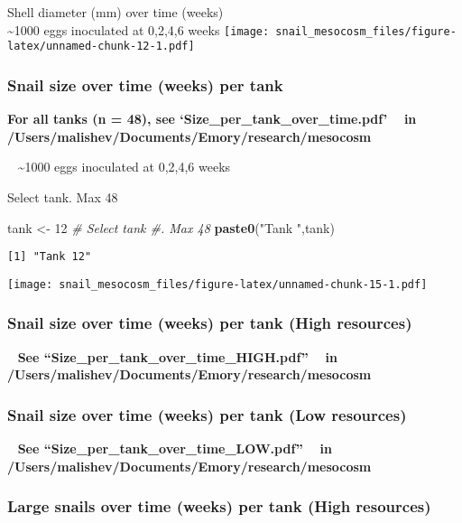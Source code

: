 \documentclass[10,portrait]{article}
\newenvironment{Shaded}{\begin{snugshade}}{\end{snugshade}}
\newcommand{\KeywordTok}[1]{\textcolor[rgb]{0.13,0.29,0.53}{\textbf{#1}}}
\newcommand{\DecValTok}[1]{\textcolor[rgb]{0.00,0.00,0.81}{#1}}
\newcommand{\StringTok}[1]{\textcolor[rgb]{0.31,0.60,0.02}{#1}}
\newcommand{\CommentTok}[1]{\textcolor[rgb]{0.56,0.35,0.01}{\textit{#1}}}
\newcommand{\NormalTok}[1]{#1}
\begin{document}
Shell diameter (mm) over time (weeks)\\
\textasciitilde{}1000 eggs inoculated at 0,2,4,6 weeks
\texttt{[image: snail\_mesocosm\_files/figure-latex/unnamed-chunk-12-1.pdf]}

\subsubsection{Snail size over time (weeks) per
tank}\label{snail-size-over-time-weeks-per-tank}

\textbf{For all tanks (n = 48), see `Size\_per\_tank\_over\_time.pdf' ~
in /Users/malishev/Documents/Emory/research/mesocosm}

~ \textasciitilde{}1000 eggs inoculated at 0,2,4,6 weeks

Select tank. Max 48

\begin{Shaded}
\begin{Highlighting}[]
\NormalTok{tank <-}\StringTok{ }\DecValTok{12} \CommentTok{# Select tank #. Max 48   }
\KeywordTok{paste0}\NormalTok{(}\StringTok{"Tank "}\NormalTok{,tank) }
\end{Highlighting}
\end{Shaded}

\begin{verbatim}
[1] "Tank 12"
\end{verbatim}

\texttt{[image: snail\_mesocosm\_files/figure-latex/unnamed-chunk-15-1.pdf]}

\subsubsection{Snail size over time (weeks) per tank (High
resources)}\label{snail-size-over-time-weeks-per-tank-high-resources}

~ \textbf{See ``Size\_per\_tank\_over\_time\_HIGH.pdf'' ~ in
/Users/malishev/Documents/Emory/research/mesocosm}

\subsubsection{Snail size over time (weeks) per tank (Low
resources)}\label{snail-size-over-time-weeks-per-tank-low-resources}

~ \textbf{See ``Size\_per\_tank\_over\_time\_LOW.pdf'' ~ in
/Users/malishev/Documents/Emory/research/mesocosm}

\subsubsection{Large snails over time (weeks) per tank (High
resources)}\label{large-snails-over-time-weeks-per-tank-high-resources}
\end{document}
